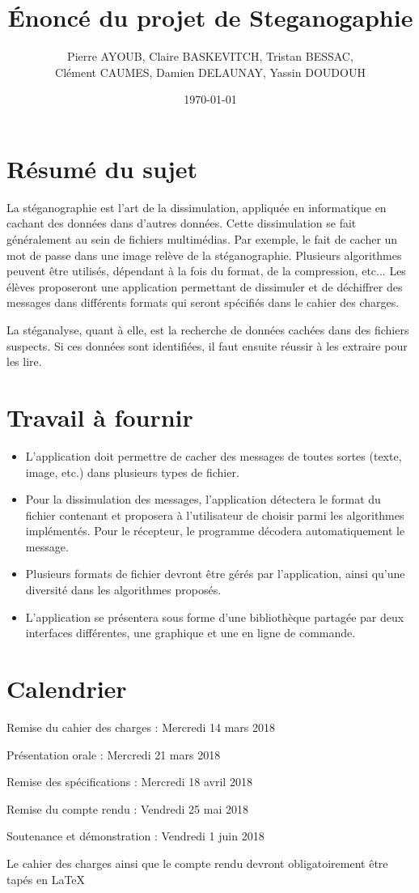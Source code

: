 \documentclass[11pt]{article}
\title{Énoncé du projet de Steganogaphie}
\author{Pierre AYOUB, Claire BASKEVITCH, Tristan BESSAC, \\
Clément CAUMES, Damien DELAUNAY, Yassin DOUDOUH}
\date\today
\begin{document}
\maketitle

\section{Résumé du sujet}

La stéganographie est l'art de la dissimulation, appliquée en informatique en
cachant des données dans d'autres données. Cette dissimulation se fait
généralement au sein de fichiers multimédias. Par exemple, le fait de cacher un
mot de passe dans une image relève de la stéganographie. Plusieurs algorithmes
peuvent être utilisés, dépendant à la fois du format, de la compression, etc...
Les élèves proposeront une application permettant de dissimuler et de déchiffrer
des messages dans différents formats qui seront spécifiés dans le cahier des
charges.

La stéganalyse, quant à elle, est la recherche de données cachées dans des
fichiers suspects. Si ces données sont identifiées, il faut ensuite réussir à les
extraire pour les lire.

\section{Travail à fournir}

\begin{itemize}
    \item L'application doit permettre de cacher des messages de toutes sortes
        (texte, image, etc.) dans plusieurs types de fichier.
    \item Pour la dissimulation des messages, l'application détectera le format
        du fichier contenant et proposera à l'utilisateur de choisir parmi les
        algorithmes implémentés. Pour le récepteur, le programme décodera
        automatiquement le message.
    \item Plusieurs formats de fichier devront être gérés par l'application,
        ainsi qu'une diversité dans les algorithmes proposés.
    \item L'application se présentera sous forme d'une bibliothèque partagée par
        deux interfaces différentes, une graphique et une en ligne de commande.
\end{itemize}

\section{Calendrier}

Remise du cahier des charges : Mercredi 14 mars 2018 

Présentation orale : Mercredi 21 mars 2018

Remise des spécifications : Mercredi 18 avril 2018

Remise du compte rendu : Vendredi 25 mai 2018 

Soutenance et démonstration : Vendredi 1 juin 2018
\vspace{1\baselineskip}

Le cahier des charges ainsi que le compte rendu devront obligatoirement être tapés en \LaTeX
\end{document}
